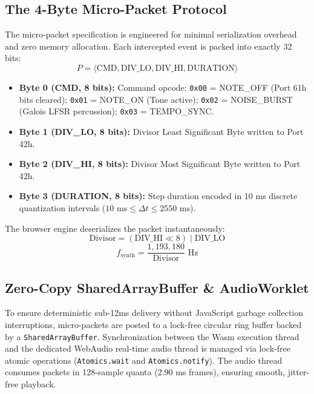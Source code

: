 \documentclass[conference]{IEEEtran}
\begin{document}
\subsection{The 4-Byte Micro-Packet Protocol}
The micro-packet specification is engineered for minimal serialization overhead and zero memory allocation. Each intercepted event is packed into exactly 32 bits:
\begin{equation}
P = \langle \text{CMD}, \text{DIV\_LO}, \text{DIV\_HI}, \text{DURATION} \rangle
\end{equation}
\begin{itemize}
\item \textbf{Byte 0 (CMD, 8 bits):} Command opcode: \texttt{0x00} = NOTE\_OFF (Port 61h bits cleared); \texttt{0x01} = NOTE\_ON (Tone active); \texttt{0x02} = NOISE\_BURST (Galois LFSR percussion); \texttt{0x03} = TEMPO\_SYNC.
\item \textbf{Byte 1 (DIV\_LO, 8 bits):} Divisor Least Significant Byte written to Port 42h.
\item \textbf{Byte 2 (DIV\_HI, 8 bits):} Divisor Most Significant Byte written to Port 42h.
\item \textbf{Byte 3 (DURATION, 8 bits):} Step duration encoded in 10 ms discrete quantization intervals ($10\text{ ms} \le \Delta t \le 2550\text{ ms}$).
\end{itemize}

The browser engine deserializes the packet instantaneously:
\begin{equation}
\text{Divisor} = (\text{DIV\_HI} \ll 8) \mid \text{DIV\_LO}
\end{equation}
\begin{equation}
f_{\text{synth}} = \frac{1,193,180}{\text{Divisor}}\text{ Hz}
\end{equation}

\subsection{Zero-Copy SharedArrayBuffer \& AudioWorklet}
To ensure deterministic sub-12ms delivery without JavaScript garbage collection interruptions, micro-packets are posted to a lock-free circular ring buffer backed by a \texttt{SharedArrayBuffer}. Synchronization between the Wasm execution thread and the dedicated WebAudio real-time audio thread is managed via lock-free atomic operations (\texttt{Atomics.wait} and \texttt{Atomics.notify}). The audio thread consumes packets in 128-sample quanta (2.90 ms frames), ensuring smooth, jitter-free playback.
\end{document}
